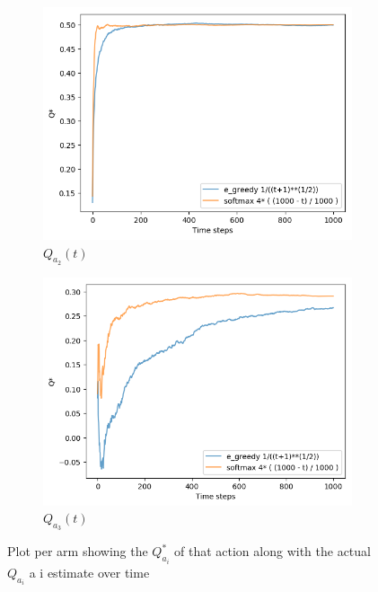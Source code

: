\documentclass[letterpaper]{article}
\begin{document}
\begin{figure}[H]
\begin{subfigure}{.5\textwidth}
    \includegraphics[width=1\linewidth]{images/assign3/ex3/qta_2}
    \caption{$Q_{a_{2}}(t)$}
    \label{fig:qta_2_ex3}
  \end{subfigure}
  \begin{subfigure}{.5\textwidth}
    \centering
    \includegraphics[width=1\linewidth]{images/assign3/ex3/qta_3}
    \caption{$Q_{a_{3}}(t)$}
    \label{fig:qta_3_ex3}
  \end{subfigure}

    \caption{Plot per arm showing
    the $Q^{*}_{a_{i}}$
    of that action along with the actual $Q_{a_{i}}$ a i estimate over time}
    \label{fig:qtas_ex3}
\end{figure}
\end{document}
